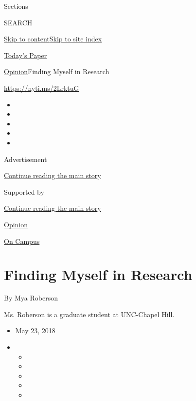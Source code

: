 Sections

SEARCH

\protect\hyperlink{site-content}{Skip to
content}\protect\hyperlink{site-index}{Skip to site index}

\href{https://myaccount.nytimes3xbfgragh.onion/auth/login?response_type=cookie\&client_id=vi}{}

\href{https://www.nytimes3xbfgragh.onion/section/todayspaper}{Today's
Paper}

\href{/section/opinion}{Opinion}\textbar{}Finding Myself in Research

\url{https://nyti.ms/2LrktuG}

\begin{itemize}
\item
\item
\item
\item
\item
\end{itemize}

Advertisement

\protect\hyperlink{after-top}{Continue reading the main story}

Supported by

\protect\hyperlink{after-sponsor}{Continue reading the main story}

\href{/section/opinion}{Opinion}

\href{/column/on-campus}{On Campus}

\hypertarget{finding-myself-in-research}{%
\section{Finding Myself in Research}\label{finding-myself-in-research}}

By Mya Roberson

Ms. Roberson is a graduate student at UNC-Chapel Hill.

\begin{itemize}
\item
  May 23, 2018
\item
  \begin{itemize}
  \item
  \item
  \item
  \item
  \item
  \end{itemize}
\end{itemize}

